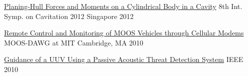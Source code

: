 
\begin{cvhonors}

  \cvhonor
    {\href{http://cav2012.sg/proceedings/pdf/285.pdf}
        {Planing-Hull Forces and Moments on a Cylindrical Body in a Cavity}}
    {8th Int. Symp. on Cavitation 2012} %
    {Singapore} %
    {2012} %

  \cvhonor
    {\href{http://oceanai.mit.edu/moos-dawg10/pmwiki/pmwiki.php?n=Talk.23-Sammut}
        {Remote Control and Monitoring of MOOS Vehicles through Cellular Modems}}
    {MOOS-DAWG at MIT} %
    {Cambridge, MA} %
    {2010} %

  \cvhonor
    {\href{https://ieeexplore.ieee.org/document/5730239}
        {Guidance of a UUV Using a Passive Acoustic Threat Detection System}}
    {IEEE} %
    {} %
    {2010} %


\end{cvhonors}
